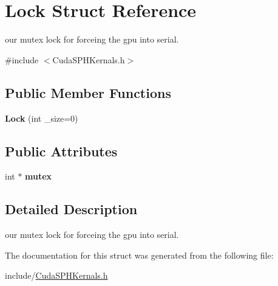 \hypertarget{struct_lock}{\section{Lock Struct Reference}
\label{struct_lock}
}


our mutex lock for forceing the gpu into serial.  




{\ttfamily \#include $<$Cuda\-S\-P\-H\-Kernals.\-h$>$}

\subsection*{Public Member Functions}
\begin{DoxyCompactItemize}
\item 
\hypertarget{struct_lock_adb222882cadefead1da4c95476675d5d}{{\bfseries Lock} (int \-\_\-size=0)}\label{struct_lock_adb222882cadefead1da4c95476675d5d}

\end{DoxyCompactItemize}
\subsection*{Public Attributes}
\begin{DoxyCompactItemize}
\item 
\hypertarget{struct_lock_a114228faccdaa7f9234c65180e2fd91c}{int $\ast$ {\bfseries mutex}}\label{struct_lock_a114228faccdaa7f9234c65180e2fd91c}

\end{DoxyCompactItemize}


\subsection{Detailed Description}
our mutex lock for forceing the gpu into serial. 

The documentation for this struct was generated from the following file\-:\begin{DoxyCompactItemize}
\item 
include/\hyperlink{_cuda_s_p_h_kernals_8h}{Cuda\-S\-P\-H\-Kernals.\-h}\end{DoxyCompactItemize}
